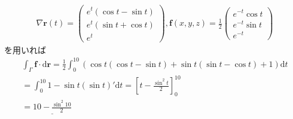\documentclass[dvipdfmx]{jsarticle}
\begin{document}
    \subsection{}
      \begin{align*}
        \nabla \bm{r}(t) =
        \begin{pmatrix}
          e^t(\cos t - \sin t)\\
          e^t(\sin t + \cos t)\\
          e^t
        \end{pmatrix}
        , \bm{f}(x, y, z) = \frac{1}{2}
        \begin{pmatrix}
          e^{-t} \cos t\\
          e^{-t} \sin t\\
          e^{-t}
        \end{pmatrix}
      \end{align*}
      を用いれば
      \begin{align*}
        \int_{\Gamma} \bm{f} \cdot \mathrm{d} \bm{r} =\frac{1}{2} \int_{0}^{10} (\cos t (\cos t - \sin t) + \sin t (\sin t - \cos t) + 1) \mathrm{d}t\\
        = \int_{0}^{10} 1 - \sin t (\sin t )' \mathrm{d}t
        = [t - \frac{\sin^2 t}{2}]_{0}^{10}\\
        = \underline{10 - \frac{\sin^2 10}{2}}
      \end{align*}
\end{document}
